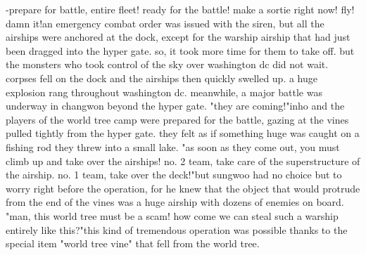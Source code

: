-prepare for battle, entire fleet! ready for the battle! make a sortie right now! fly! damn it!an emergency combat order was issued with the siren, but all the airships were anchored at the dock, except for the warship airship that had just been dragged into the hyper gate.
so, it took more time for them to take off.
but the monsters who took control of the sky over washington dc did not wait.
 corpses fell on the dock and the airships then quickly swelled up.
a huge explosion rang throughout washington dc.
meanwhile, a major battle was underway in changwon beyond the hyper gate.
"they are coming!"inho and the players of the world tree camp were prepared for the battle, gazing at the vines pulled tightly from the hyper gate.
 they felt as if something huge was caught on a fishing rod they threw into a small lake.
"as soon as they come out, you must climb up and take over the airships! no.
 2 team, take care of the superstructure of the airship.
 no.
 1 team, take over the deck!"but sungwoo had no choice but to worry right before the operation, for he knew that the object that would protrude from the end of the vines was a huge airship with dozens of enemies on board.
"man, this world tree must be a scam! how come we can steal such a warship entirely like this?"this kind of tremendous operation was possible thanks to the special item "world tree vine" that fell from the world tree.


 